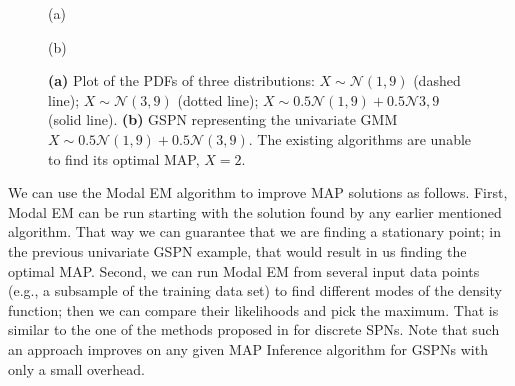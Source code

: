 \documentclass[12pt]{article}
\begin{document}
\begin{figure}
  \begin{minipage}{0.5\textwidth}
    \centering

    (a)
  \end{minipage}\begin{minipage}{0.5\textwidth}
    \centering

    (b)
  \end{minipage}

  \caption{
    \textbf{(a)} Plot of the PDFs of three distributions: $X \sim \mathcal{N}(1, 9)$ (dashed line); $X \sim \mathcal{N}(3, 9)$ (dotted line); $X \sim 0.5 \mathcal{N}(1, 9) + 0.5 \mathcal{N}{3, 9}$ (solid line).
    \textbf{(b)} GSPN representing the univariate GMM $X \sim 0.5 \mathcal{N}(1, 9) + 0.5 \mathcal{N}(3, 9)$. The existing algorithms are unable to find its optimal MAP, $X = 2$.
  }
  \label{fig:shortcomings}
\end{figure}

We can use the Modal EM algorithm to improve MAP solutions as follows. 
First, Modal EM can be run starting with the solution found by any earlier mentioned algorithm. That way we can guarantee that we are finding a stationary point; in the previous univariate GSPN example, that would result in us finding the optimal MAP. Second, we can run Modal EM from several input data points (e.g., a subsample of the training data set) to find different modes of the density function; then we can compare their likelihoods and pick the maximum. 
That is similar to the one of the methods proposed in \cite{julissa-bracis} for discrete SPNs. 
Note that such an approach improves on any given MAP Inference algorithm for GSPNs with only a small overhead.
\end{document}
